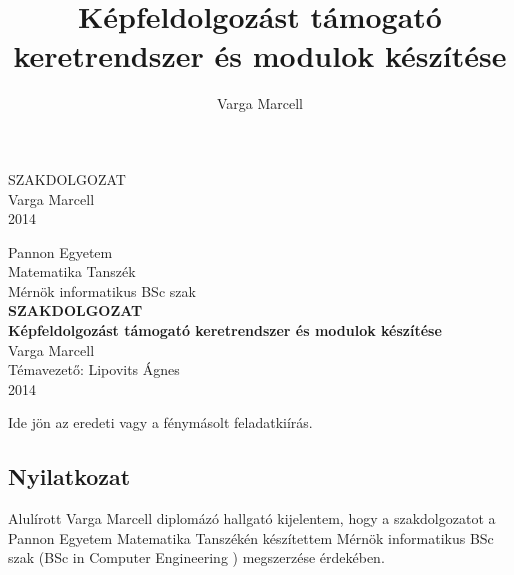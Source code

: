 \documentclass[a4paper,12pt,oneside]{report}
\title{Képfeldolgozást támogató keretrendszer és modulok készítése}
\author{Varga Marcell}
\date{}
\begin{document}

\setcounter{chapter}{1}

\pagestyle{empty}
{
    \begin{center}
    \vspace*{5cm}
    {
        \Huge SZAKDOLGOZAT}\\
        \vspace*{10cm}
        {\LARGE Varga Marcell}\\
        \vspace*{3cm}
        {\LARGE 2014}
    \end{center}
}
\newpage

\begin{center}
{
    \Large Pannon Egyetem\\
    Matematika Tanszék\vspace*{3mm}\\
    Mérnök informatikus BSc szak
}
    \vspace*{2cm}\\
    {\LARGE \bf SZAKDOLGOZAT}
    \vspace{3cm}\\
    {\LARGE\bf Képfeldolgozást támogató keretrendszer és modulok készítése }
    \vspace{3cm}\\
    {\large Varga Marcell}
    \vspace{6cm}
    \\
    {\large Témavezető: Lipovits Ágnes}
    \vspace{1cm}\\
    {\large 2014}
\end{center}
\normalsize
\newpage

Ide jön az eredeti vagy a fénymásolt feladatkiírás.
\newpage

\begin{center}
\section*{Nyilatkozat}
\end{center}

Alulírott Varga Marcell diplomázó hallgató kijelentem, hogy a szakdolgozatot a Pannon Egyetem Matematika Tanszékén készítettem Mérnök informatikus BSc szak (BSc in Computer Engineering
) megszerzése érdekében.
\end{document}
